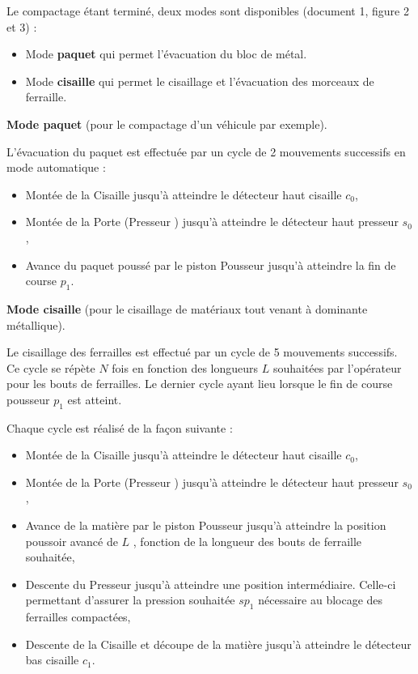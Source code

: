 Le compactage étant terminé, deux modes sont disponibles (document 1, figure 2 et 3) :
\begin{itemize}
 \item Mode \textbf{paquet} qui permet l'évacuation du bloc de métal.
 \item Mode \textbf{cisaille} qui permet le cisaillage et l'évacuation des morceaux de ferraille.
\end{itemize}

\textbf{Mode paquet} (pour le compactage d'un véhicule par exemple).

L'évacuation du paquet est effectuée par un cycle de 2 mouvements successifs en mode automatique :
\begin{itemize}
 \item Montée de la \og Cisaille \fg jusqu'à atteindre le détecteur haut cisaille $c_0$,
 \item Montée de la Porte (\og Presseur \fg) jusqu'à atteindre le détecteur haut presseur $s_0$,
 \item Avance du paquet poussé par le piston \og Pousseur \fg jusqu'à atteindre la fin de course $p_1$.
\end{itemize}

\textbf{Mode cisaille} (pour le cisaillage de matériaux tout venant à dominante métallique).

Le cisaillage des ferrailles est effectué par un cycle de 5 mouvements successifs. Ce cycle se répète $N$ fois en fonction des longueurs $L$ souhaitées par l'opérateur pour les bouts de ferrailles. Le dernier cycle ayant lieu lorsque le fin de course pousseur $p_1$ est atteint.

Chaque cycle est réalisé de la façon suivante :
\begin{itemize}
 \item Montée de la \og Cisaille \fg jusqu'à atteindre le détecteur haut cisaille $c_0$,
 \item Montée de la Porte (\og Presseur \fg) jusqu'à atteindre le détecteur haut presseur $s_0$,
 \item Avance de la matière par le piston \og Pousseur \fg jusqu'à atteindre la position \og poussoir avancé de $L$ \fg, fonction de la longueur des bouts de ferraille souhaitée,
 \item Descente du \og Presseur \fg jusqu'à atteindre une position intermédiaire. Celle-ci permettant d'assurer la pression souhaitée $sp_1$ nécessaire au blocage des ferrailles compactées,
 \item Descente de la \og Cisaille \fg et découpe de la matière jusqu'à atteindre le détecteur bas cisaille $c_1$.
\end{itemize}


